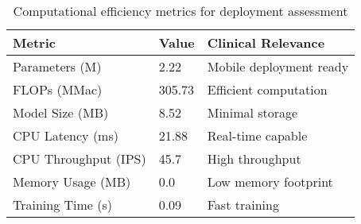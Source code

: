 \begin{table}
\caption{Computational efficiency metrics for deployment assessment}
\label{tab:efficiency}
\begin{tabular}{lll}
\toprule
Metric & Value & Clinical Relevance \\
\midrule
Parameters (M) & 2.22 & Mobile deployment ready \\
FLOPs (MMac) & 305.73 & Efficient computation \\
Model Size (MB) & 8.52 & Minimal storage \\
CPU Latency (ms) & 21.88 & Real-time capable \\
CPU Throughput (IPS) & 45.7 & High throughput \\
Memory Usage (MB) & 0.0 & Low memory footprint \\
Training Time (s) & 0.09 & Fast training \\
\bottomrule
\end{tabular}
\end{table}
